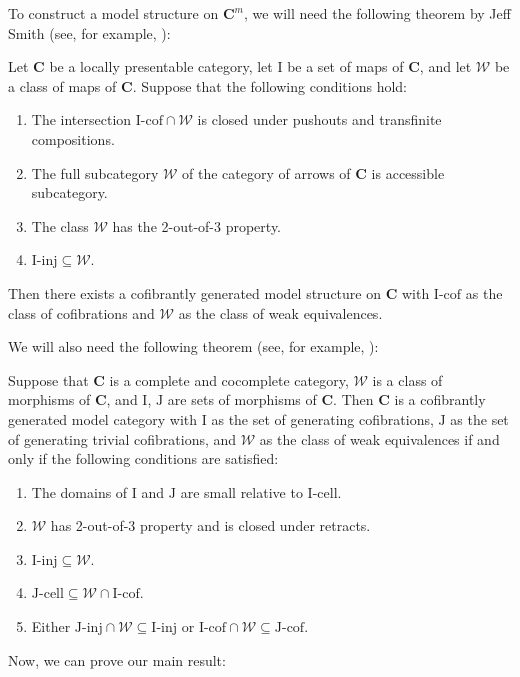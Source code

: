 \documentclass[reqno]{amsart}
\theoremstyle{definition}
\theoremstyle{remark}
\newcommand{\cat}[1]{\mathbf{#1}}
\newcommand{\C}{\cat{C}}
\newcommand{\we}{\mathcal{W}}
\newcommand{\I}{\mathrm{I}}
\newcommand{\J}{\mathrm{J}}
\newcommand{\class}[2]{#1\text{-}\mathrm{#2}}
\newcommand{\Icell}[1][\I]{\class{#1}{cell}}
\newcommand{\Icof}[1][\I]{\class{#1}{cof}}
\newcommand{\Iinj}[1][\I]{\class{#1}{inj}}
\newcommand{\Jinj}[1][]{\Iinj[\J#1]}
\newcommand{\Jcell}[1][]{\Icell[\J#1]}
\newcommand{\Jcof}[1][]{\Icof[\J#1]}
\numberwithin{figure}{section}
\begin{document}
To construct a model structure on $\C^m$, we will need the following theorem by Jeff Smith (see, for example, \cite[Proposition~A.2.6.8]{lurie-topos}):
\begin{thm}
Let $\C$ be a locally presentable category, let $\I$ be a set of maps of $\C$, and let $\we$ be a class of maps of $\C$.
Suppose that the following conditions hold:
\begin{enumerate}
\item The intersection $\Icof \cap \we$ is closed under pushouts and transfinite compositions.
\item The full subcategory $\we$ of the category of arrows of $\C$ is accessible subcategory.
\item The class $\we$ has the 2-out-of-3 property.
\item $\Iinj \subseteq \we$.
\end{enumerate}
Then there exists a cofibrantly generated model structure on $\C$ with $\Icof$ as the class of cofibrations and $\we$ as the class of weak equivalences.
\end{thm}

We will also need the following theorem (see, for example, \cite[Theorem~2.1.19]{hovey}):
\begin{thm}
Suppose that $\C$ is a complete and cocomplete category, $\we$ is a class of morphisms of $\C$, and $\I$, $\J$ are sets of morphisms of $\C$.
Then $\C$ is a cofibrantly generated model category with $\I$ as the set of generating cofibrations,
$\J$ as the set of generating trivial cofibrations, and $\we$ as the class of weak equivalences if and only if the following conditions are satisfied:
\begin{enumerate}
\item The domains of $\I$ and $\J$ are small relative to $\Icell$.
\item $\we$ has 2-out-of-3 property and is closed under retracts.
\item $\Iinj \subseteq \we$.
\item $\Jcell \subseteq \we \cap \Icof$.
\item Either $\Jinj \cap \we \subseteq \Iinj$ or $\Icof \cap \we \subseteq \Jcof$.
\end{enumerate}
\end{thm}

Now, we can prove our main result:
\end{document}
